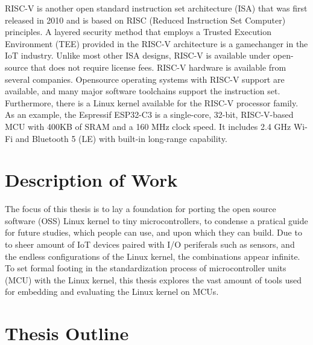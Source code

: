 RISC-V is another open standard instruction set architecture (ISA) that was first released in 2010 and is based on RISC (Reduced Instruction Set Computer) principles. A layered security method that employs a Trusted Execution Environment (TEE) provided in the RISC-V architecture is a gamechanger in the IoT industry. Unlike most other ISA designs, RISC-V is available under open-source that does not require license fees. RISC-V hardware is available from several companies. Opensource operating systems with RISC-V support are available, and many major software toolchains support the instruction set. Furthermore, there is a Linux kernel available for the RISC-V processor family. As an example, the Espressif ESP32-C3 is a single-core, 32-bit, RISC-V-based MCU with 400KB of SRAM and a 160 MHz clock speed. It includes 2.4 GHz Wi-Fi and Bluetooth 5 (LE) with built-in long-range capability.


\section{Description of Work}

The focus of this thesis is to lay a foundation for porting the open source software (OSS) Linux kernel to tiny microcontrollers, to condense a pratical guide for future studies, which people can use, and upon which they can build. Due to to sheer amount of IoT devices paired with I/O periferals such as sensors, and the endless configurations of the Linux kernel, the combinations appear infinite. To set formal footing in the standardization process of microcontroller units (MCU) with the Linux kernel, this thesis explores the vast amount of tools used for embedding and evaluating the Linux kernel on MCUs.

\section{Thesis Outline}



